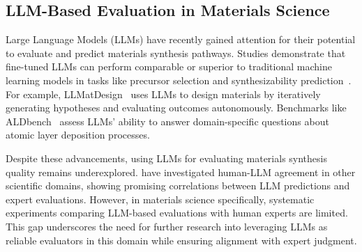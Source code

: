 \subsection{LLM-Based Evaluation in Materials Science}

Large Language Models (LLMs) have recently gained attention for their potential to evaluate and predict materials synthesis pathways. Studies demonstrate that fine-tuned LLMs can perform comparable or superior to traditional machine learning models in tasks like precursor selection and synthesizability prediction~\cite{lei2024materials,kim2024large}. For example, LLMatDesign~\cite{jia2024llmatdesign} uses LLMs to design materials by iteratively generating hypotheses and evaluating outcomes autonomously. Benchmarks like ALDbench~\cite{yanguas2024benchmarking} assess LLMs' ability to answer domain-specific questions about atomic layer deposition processes. 

Despite these advancements, using LLMs for evaluating materials synthesis quality remains underexplored. \citeauthor{luo2024large} have investigated human-LLM agreement in other scientific domains, showing promising correlations between LLM predictions and expert evaluations. However, in materials science specifically, systematic experiments comparing LLM-based evaluations with human experts are limited. This gap underscores the need for further research into leveraging LLMs as reliable evaluators in this domain while ensuring alignment with expert judgment.
